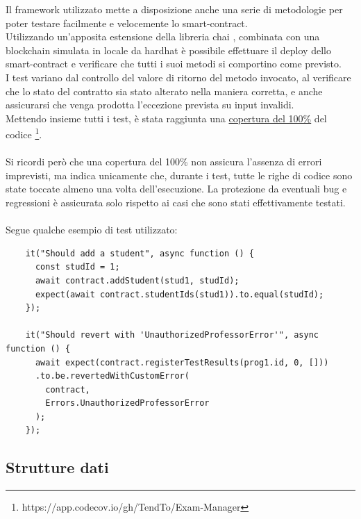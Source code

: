 Il framework utilizzato mette a disposizione anche una serie di metodologie per poter testare facilmente e velocemente lo \gls{smart-contract}. \\
Utilizzando un'apposita estensione della libreria chai \cite{soft:chai}, combinata con una blockchain simulata in locale da hardhat
è possibile effettuare il deploy dello \gls{smart-contract} e verificare che tutti i suoi metodi si comportino come previsto. \\
I test variano dal controllo del valore di ritorno del metodo invocato, al verificare che lo stato del contratto sia stato alterato nella maniera corretta,
e anche assicurarsi che venga prodotta l'eccezione prevista su input invalidi. \\
Mettendo insieme tutti i test, è stata raggiunta una \href{https://app.codecov.io/gh/TendTo/Exam-Manager}{copertura del 100\%} del codice \footnote{https://app.codecov.io/gh/TendTo/Exam-Manager}. \\
\\
Si ricordi però che una copertura del 100\% non assicura l'assenza di errori imprevisti, ma indica unicamente che, durante i test,
tutte le righe di codice sono state toccate almeno una volta dell'esecuzione.
La protezione da eventuali bug e regressioni è assicurata solo rispetto ai casi che sono stati effettivamente testati.\\
\\
Segue qualche esempio di test utilizzato:
\begin{verbatim}
    it("Should add a student", async function () {
      const studId = 1;
      await contract.addStudent(stud1, studId);
      expect(await contract.studentIds(stud1)).to.equal(studId);
    });

    it("Should revert with 'UnauthorizedProfessorError'", async function () {
      await expect(contract.registerTestResults(prog1.id, 0, []))
      .to.be.revertedWithCustomError(
        contract,
        Errors.UnauthorizedProfessorError
      );
    });
\end{verbatim}

\subsection{Strutture dati}

